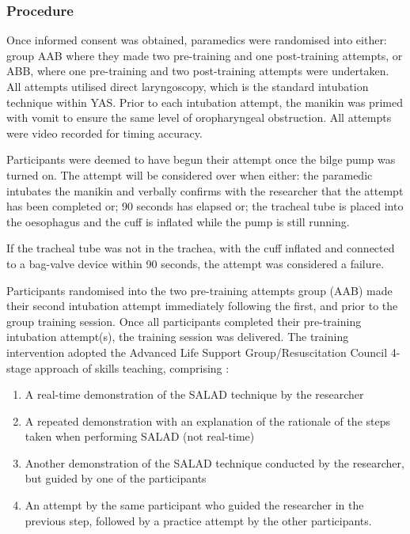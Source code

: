 \documentclass[]{article}
\providecommand{\tightlist}{%
  \setlength{\itemsep}{0pt}\setlength{\parskip}{0pt}}
\begin{document}
\hypertarget{procedure}{%
\subsubsection{Procedure}\label{procedure}}

Once informed consent was obtained, paramedics were randomised into
either: group AAB where they made two pre-training and one post-training
attempts, or ABB, where one pre-training and two post-training attempts
were undertaken. All attempts utilised direct laryngoscopy, which is the
standard intubation technique within YAS. Prior to each intubation
attempt, the manikin was primed with vomit to ensure the same level of
oropharyngeal obstruction. All attempts were video recorded for timing
accuracy.

Participants were deemed to have begun their attempt once the bilge pump
was turned on. The attempt will be considered over when either: the
paramedic intubates the manikin and verbally confirms with the
researcher that the attempt has been completed or; 90 seconds has
elapsed or; the tracheal tube is placed into the oesophagus and the cuff
is inflated while the pump is still running.

If the tracheal tube was not in the trachea, with the cuff inflated and
connected to a bag-valve device within 90 seconds, the attempt was
considered a failure.

Participants randomised into the two pre-training attempts group (AAB)
made their second intubation attempt immediately following the first,
and prior to the group training session. Once all participants completed
their pre-training intubation attempt(s), the training session was
delivered. The training intervention adopted the Advanced Life Support
Group/Resuscitation Council 4-stage approach of skills teaching,
comprising \citep{bullock_pocket_2008}:

\begin{enumerate}
\def\labelenumi{\arabic{enumi}.}
\tightlist
\item
  A real-time demonstration of the SALAD technique by the researcher
\item
  A repeated demonstration with an explanation of the rationale of the
  steps taken when performing SALAD (not real-time)
\item
  Another demonstration of the SALAD technique conducted by the
  researcher, but guided by one of the participants
\item
  An attempt by the same participant who guided the researcher in the
  previous step, followed by a practice attempt by the other
  participants.
\end{enumerate}
\end{document}
